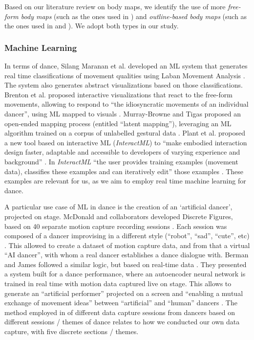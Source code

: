 Based on our literature review on body maps, we identify the use of more \textit{free-form body maps} (such as the ones used in \cite{gastaldo_body-map_2012}) and \textit{outline-based body maps} (such as the ones used in \cite{windlin_soma_2019} and \cite{nummenmaa_bodily_2014}). We adopt both types in our study.

\subsubsection{Machine Learning}

In terms of dance, Silang Maranan et al. developed an ML system that generates real time classifications of movement qualities using Laban Movement Analysis \cite{silang_maranan_designing_2014}. The system also generates abstract visualizations based on those classifications. Brenton et al. proposed interactive visualizations that react to the free-form movements, allowing to respond to “the idiosyncratic movements of an individual dancer”, using ML mapped to visuals \cite{brenton_embodied_2014}. Murray-Browne and Tigas proposed an open-ended mapping process (entitled “latent mapping”), leveraging an ML algorithm trained on a corpus of unlabelled gestural data \cite{murray-browne_latent_2021}. Plant et al. proposed a new tool based on interactive ML (\textit{InteractML}) to “make embodied interaction design faster, adaptable and accessible to developers of varying experience and background” \cite{plant_movement_2020}. In \textit{InteractML} “the user provides training examples (movement data), classifies these examples and can iteratively edit” those examples \cite{plant_movement_2020}. These examples are relevant for us, as we aim to employ real time machine learning for dance.

A particular use case of ML in dance is the creation of an ‘artificial dancer’, projected on stage. McDonald and collaborators developed Discrete Figures, based on 40 separate motion capture recording sessions \cite{mcdonald_dance_2018}. Each session was composed of a dancer improvising in a different style (“robot”, “sad”, “cute”, etc) \cite{mcdonald_dance_2018}. This allowed to create a dataset of motion capture data, and from that a virtual “AI dancer”, with whom a real dancer establishes a dance dialogue with. Berman and James followed a similar logic, but based on real-time data \cite{liapis_learning_2018}. They presented a system built for a dance performance, where an autoencoder neural network is trained in real time with motion data captured live on stage. This allows to generate an “artificial performer” projected on a screen and “enabling a mutual exchange of movement ideas” between “artificial” and “human” dancers \cite{liapis_learning_2018}. The method employed in \cite{mcdonald_dance_2018} of different data capture sessions from dancers based on different sessions / themes of dance relates to how we conducted our own data capture, with five discrete sections / themes.

